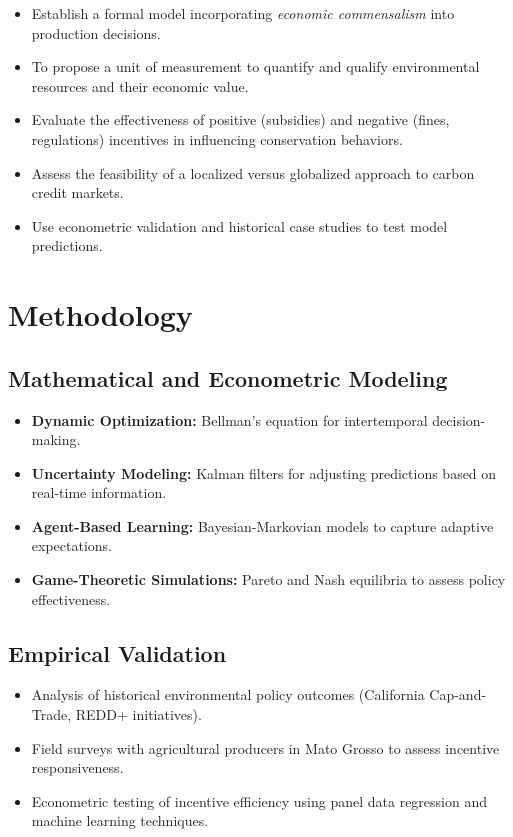 \documentclass[a4paper,12pt]{article}
\begin{document}
\begin{itemize}
    \item Establish a formal model incorporating \textit{economic commensalism} into production decisions.
    \item To propose a unit of measurement to quantify and qualify environmental resources and their economic value.
    \item Evaluate the effectiveness of positive (subsidies) and negative (fines, regulations) incentives in influencing conservation behaviors.
    \item Assess the feasibility of a localized versus globalized approach to carbon credit markets.
    \item Use econometric validation and historical case studies to test model predictions.
\end{itemize}

\newpage

\section{Methodology}

\subsection{Mathematical and Econometric Modeling}
\begin{itemize}
    \item \textbf{Dynamic Optimization:} Bellman’s equation for intertemporal decision-making.
    \item \textbf{Uncertainty Modeling:} Kalman filters for adjusting predictions based on real-time information.
    \item \textbf{Agent-Based Learning:} Bayesian-Markovian models to capture adaptive expectations.
    \item \textbf{Game-Theoretic Simulations:} Pareto and Nash equilibria to assess policy effectiveness.
\end{itemize}

\subsection{Empirical Validation}
\begin{itemize}
    \item Analysis of historical environmental policy outcomes (California Cap-and-Trade, REDD+ initiatives).
    \item Field surveys with agricultural producers in Mato Grosso to assess incentive responsiveness.
    \item Econometric testing of incentive efficiency using panel data regression and machine learning techniques.
\end{itemize}
\end{document}
